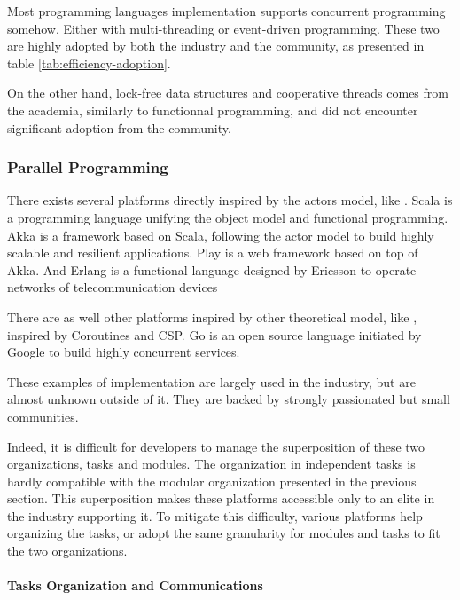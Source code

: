 Most programming languages implementation supports concurrent programming somehow.
Either with multi-threading or event-driven programming.
These two are highly adopted by both the industry and the community, as presented in table \ref{tab:efficiency-adoption}.

On the other hand, lock-free data structures and cooperative threads comes from the academia, similarly to functionnal programming, and did not encounter significant adoption from the community.

\subsubsection{Parallel Programming}

There exists several platforms directly inspired by the actors model, like .
Scala is a programming language unifying the object model and functional programming.
Akka is a framework based on Scala, following the actor model to build highly scalable and resilient applications.
Play is a web framework based on top of Akka.
And Erlang is a functional language designed by Ericsson to operate networks of telecommunication devices \cite{Armstrong1993,Nelson2004,Armstrong2014}

There are as well other platforms inspired by other theoretical model, like , inspired by Coroutines and CSP.
Go is an open source language initiated by Google to build highly concurrent services.

These examples of implementation are largely used in the industry, but are almost unknown outside of it.
They are backed by strongly passionated but small communities.

Indeed, it is difficult for developers to manage the superposition of these two organizations, tasks and modules.
The organization in independent tasks is hardly compatible with the modular organization presented in the previous section.
This superposition makes these platforms accessible only to an elite in the industry supporting it.
To mitigate this difficulty, various platforms help organizing the tasks, or adopt the same granularity for modules and tasks to fit the two organizations.

\paragraph{Tasks Organization and Communications}

